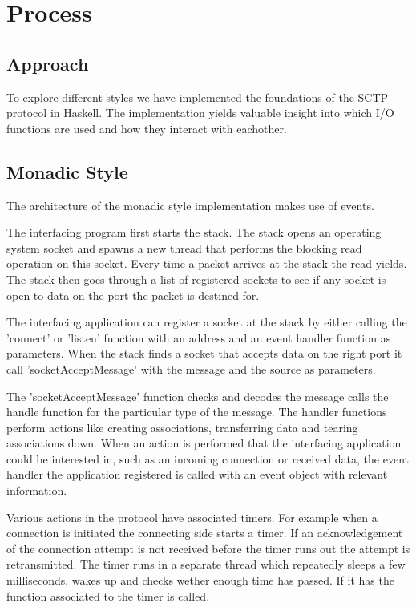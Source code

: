 \chapter{Process}
\section{Approach}
To explore different styles we have implemented the foundations of the SCTP protocol\cite{_rfc_????} in Haskell. The implementation yields valuable insight into which I/O functions are used and how they interact with eachother.
\section{Monadic Style}
The architecture of the monadic style implementation makes use of events.

The interfacing program first starts the stack. The stack opens an operating system socket and spawns a new thread that performs the blocking read operation on this socket. Every time a packet arrives at the stack the read yields. The stack then goes through a list of registered sockets to see if any socket is open to data on the port the packet is destined for.

The interfacing application can register a socket at the stack by either calling the 'connect' or 'listen' function with an address and an event handler function as parameters.
When the stack finds a socket that accepts data on the right port it call 'socketAcceptMessage' with the message and the source as parameters.

The 'socketAcceptMessage' function checks and decodes the message calls the handle function for the particular type of the message. The handler functions perform actions like creating associations, transferring data and tearing associations down. When an action is performed that the interfacing application could be interested in, such as an incoming connection or received data, the event handler the application registered is called with an event object with relevant information.

Various actions in the protocol have associated timers. For example when a connection is initiated the connecting side starts a timer. If an acknowledgement of the connection attempt is not received before the timer runs out the attempt is retransmitted. The timer runs in a separate thread which repeatedly sleeps a few milliseconds, wakes up and checks wether enough time has passed. If it has the function associated to the timer is called.

